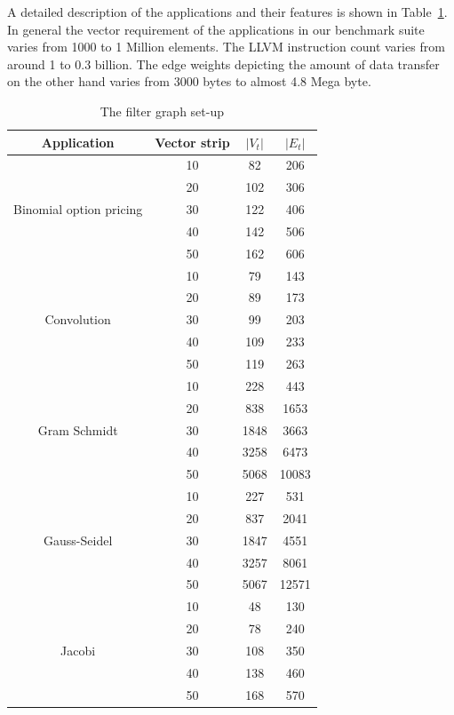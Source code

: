 A detailed description of the applications and their features is shown
in Table~\ref{tab:1}. In general the vector requirement of the
applications in our benchmark suite varies from 1000 to 1 Million
elements. The LLVM instruction count varies from around 1 to 0.3
billion. The edge weights depicting the amount of data transfer on the
other hand varies from 3000 bytes to almost 4.8 Mega byte.

\begin{table}[h!]
  \centering
  \begin{tabular}{|c|c|c|c|}
    \hline
    \textbf{Application} & \textbf{Vector strip} & $|V_t|$ & $|E_t|$ \\
    \hline
    \multirow{5}{*}{Binomial option pricing} & 10 & 82 & 206 \\
    & 20 & 102 & 306 \\
    & 30 & 122 & 406 \\
    & 40 & 142 & 506 \\
    & 50 & 162 & 606 \\
    \hline
    \multirow{5}{*}{Convolution} & 10 & 79 & 143 \\
    & 20 & 89 & 173 \\
    & 30 & 99 & 203 \\
    & 40 & 109 & 233 \\
    & 50 & 119 & 263 \\
    \hline
    \multirow{5}{*}{Gram Schmidt} & 10 & 228 & 443 \\
    & 20 & 838 & 1653 \\
    & 30 & 1848 & 3663 \\
    & 40 & 3258 & 6473 \\
    & 50 & 5068 & 10083\\
    \hline
    \multirow{5}{*}{Gauss-Seidel} & 10 & 227 & 531 \\
    & 20 & 837 & 2041 \\
    & 30 & 1847 & 4551 \\
    & 40 & 3257 & 8061 \\
    & 50 & 5067 & 12571\\
    \hline
    \multirow{5}{*}{Jacobi} & 10 & 48 & 130 \\
    & 20 & 78 & 240 \\
    & 30 & 108 & 350 \\
    & 40 & 138 & 460 \\
    & 50 & 168 & 570\\
    \hline
  \end{tabular}
  \caption{The filter graph set-up}
  \label{tab:1}
\end{table}

